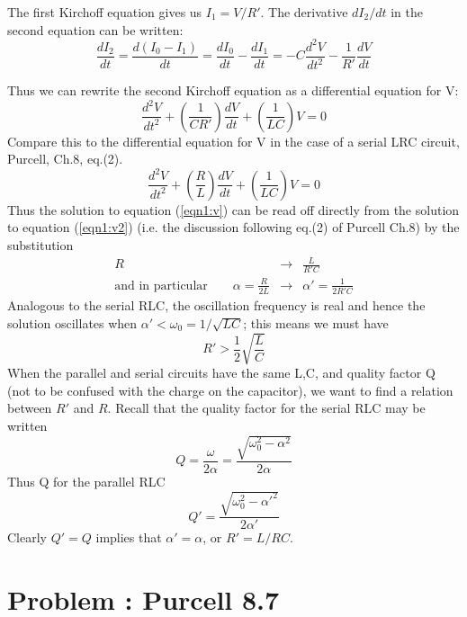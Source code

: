 \documentclass[solutions]{esg8022pset}
\begin{document}
The first Kirchoff equation gives us $I_1=V/R'$. The derivative
$dI_2/dt$ in the second equation can be written:
\begin{equation}
\frac{dI_2}{dt}=\frac{d(I_0-I_1)}{dt}=\frac{dI_0}{dt}-\frac{dI_1}{dt}=-C\frac{d^2V}{dt^2}-\frac{1}{R'}\frac{dV}{dt}
\end{equation}

Thus we can rewrite the second Kirchoff equation as a differential
equation for V:
\begin{equation}\label{eqn1:v}
\frac{d^2V}{dt^2}+\left(\frac{1}{CR'}\right)\frac{dV}{dt}+\left(\frac{1}{LC}\right)V=0
\end{equation}
Compare this to the differential equation for V in the case of a
serial LRC circuit, Purcell, Ch.8, eq.(2).
\begin{equation}\label{eqn1:v2}
\frac{d^2V}{dt^2}+\left(\frac{R}{L}\right)\frac{dV}{dt}+\left(\frac{1}{LC}\right)V=0
\end{equation}
Thus the solution to equation (\ref{eqn1:v}) can be read off directly
from the solution to equation (\ref{eqn1:v2}) (i.e. the discussion
following eq.(2) of Purcell Ch.8) by the substitution
\begin{eqnarray}
R &\rightarrow & \frac{L}{R'C}\\ \textrm{and in particular}\qquad
\alpha=\frac{R}{2L} &\rightarrow & \alpha'=\frac{1}{2R'C}
\end{eqnarray}
Analogous to the serial RLC, the oscillation frequency is real and hence
the solution oscillates when $\alpha'<\omega_0=1/\sqrt{LC}$; this
means we must have
\begin{equation}
R'>\frac{1}{2}\sqrt{\frac{L}{C}}
\end{equation}
When the parallel and serial circuits have the same L,C, and quality
factor Q (not to be confused with the charge on the capacitor), we
want to find a relation between $R'$ and $R$.  Recall that the quality
factor for the serial RLC may be written
\begin{equation}
Q=\frac{\omega}{2\alpha}=\frac{\sqrt{\omega_0^2-\alpha^2}}{2\alpha}
\end{equation}
Thus Q for the parallel RLC
\begin{equation}
Q'=\frac{\sqrt{\omega_0^2-\alpha'^2}}{2\alpha'}
\end{equation}
Clearly $Q'=Q$ implies that $\alpha'=\alpha$, or $R'=L/RC$.

\section{Problem \thesection: Purcell 8.7}
\end{document}
